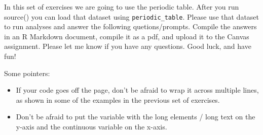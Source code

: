 \documentclass[
]{krantz}
\begin{document}
In this set of exercises we are going to use the periodic table. After you run source() you can load that dataset using \texttt{periodic\_table}. Please use that dataset to run analyses and answer the following quetions/prompts. Compile the answers in an R Markdown document, compile it as a pdf, and upload it to the Canvas assignment. Please let me know if you have any questions. Good luck, and have fun!

Some pointers:

\begin{itemize}
\item
  If your code goes off the page, don't be afraid to wrap it across multiple lines, as shown in some of the examples in the previous set of exercises.
\item
  Don't be afraid to put the variable with the long elements / long text on the y-axis and the continuous variable on the x-axis.
\end{itemize}
\end{document}
